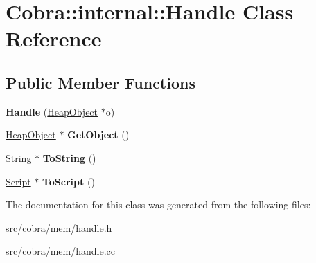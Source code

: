 \hypertarget{class_cobra_1_1internal_1_1_handle}{\section{Cobra\+:\+:internal\+:\+:Handle Class Reference}
\label{class_cobra_1_1internal_1_1_handle}
}
\subsection*{Public Member Functions}
\begin{DoxyCompactItemize}
\item 
\hypertarget{class_cobra_1_1internal_1_1_handle_aa05c7bf3eac07b8c7a3f2648c90e5171}{{\bfseries Handle} (\hyperlink{struct_cobra_1_1internal_1_1_heap_object}{Heap\+Object} $\ast$o)}\label{class_cobra_1_1internal_1_1_handle_aa05c7bf3eac07b8c7a3f2648c90e5171}

\item 
\hypertarget{class_cobra_1_1internal_1_1_handle_a73e7eec02b0364ff8b93d058262858f9}{\hyperlink{struct_cobra_1_1internal_1_1_heap_object}{Heap\+Object} $\ast$ {\bfseries Get\+Object} ()}\label{class_cobra_1_1internal_1_1_handle_a73e7eec02b0364ff8b93d058262858f9}

\item 
\hypertarget{class_cobra_1_1internal_1_1_handle_ab41a1526137640b18e2c6f2da297a80a}{\hyperlink{class_cobra_1_1internal_1_1_string}{String} $\ast$ {\bfseries To\+String} ()}\label{class_cobra_1_1internal_1_1_handle_ab41a1526137640b18e2c6f2da297a80a}

\item 
\hypertarget{class_cobra_1_1internal_1_1_handle_a8373f2edb1922a2da2c5b62ae6f700af}{\hyperlink{class_cobra_1_1internal_1_1_script}{Script} $\ast$ {\bfseries To\+Script} ()}\label{class_cobra_1_1internal_1_1_handle_a8373f2edb1922a2da2c5b62ae6f700af}

\end{DoxyCompactItemize}


The documentation for this class was generated from the following files\+:\begin{DoxyCompactItemize}
\item 
src/cobra/mem/handle.\+h\item 
src/cobra/mem/handle.\+cc\end{DoxyCompactItemize}
